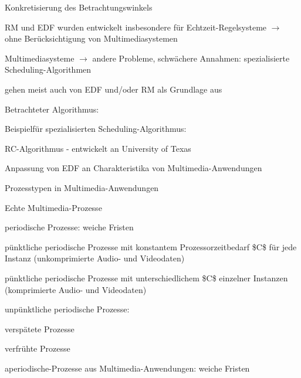 \documentclass[a4paper]{article}
\begin{document}
\begin{multicols}{3}
    \begin{itemize*}
        \item
        Konkretisierung des Betrachtungswinkels
        \begin{itemize*}
            \item RM und EDF wurden entwickelt insbesondere für Echtzeit-Regelsysteme $\rightarrow$ ohne Berücksichtigung von Multimediasystemen
            \item Multimediasysteme $\rightarrow$ andere Probleme, schwächere Annahmen: spezialisierte Scheduling-Algorithmen
            \item gehen meist auch von EDF und/oder RM als Grundlage aus
        \end{itemize*}
        \item
        Betrachteter Algorithmus:
        \begin{itemize*}
            \item Beispielfür spezialisierten Scheduling-Algorithmus: \begin{itemize*} \item RC-Algorithmus - entwickelt an University of Texas \item Anpassung von EDF an Charakteristika von Multimedia-Anwendungen \end{itemize*}
        \end{itemize*}
    \end{itemize*}

    Prozesstypen in Multimedia-Anwendungen

    \begin{enumerate*}
        \item
        Echte Multimedia-Prozesse
    \end{enumerate*}

    \begin{itemize*}
        \item
        periodische Prozesse: weiche Fristen
        \begin{enumerate*}

            \item pünktliche periodische Prozesse mit konstantem Prozessorzeitbedarf \$C\$ für jede Instanz (unkomprimierte Audio- und Videodaten)
            \item pünktliche periodische Prozesse mit unterschiedlichem \$C\$ einzelner Instanzen (komprimierte Audio- und Videodaten)
            \item unpünktliche periodische Prozesse: \begin{itemize*} \item verspätete Prozesse \item verfrühte Prozesse \end{itemize*}
        \end{enumerate*}
        \item
        aperiodische-Prozesse aus Multimedia-Anwendungen: weiche Fristen
    \end{itemize*}


\end{multicols}
\end{document}

